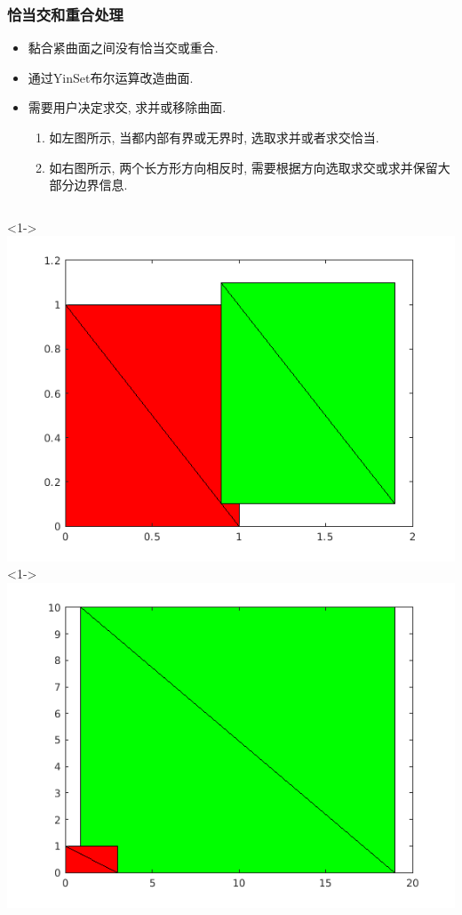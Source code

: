 \documentclass[UTF8]{ctexbeamer}	%
\theoremstyle{plain}
\theoremstyle{definition}
\theoremstyle{remark}
\numberwithin{equation}{section}
\begin{document}
\begin{frame}
    \frametitle{恰当交和重合处理}
    \begin{itemize}
        \item 黏合紧曲面之间没有恰当交或重合.

        \item 通过YinSet布尔运算改造曲面.
        
        \item 需要用户决定求交, 求并或移除曲面.
        \begin{enumerate}[1]
            \item 如左图所示, 当都内部有界或无界时,
            选取求并或者求交恰当.
            \item 如右图所示, 两个长方形方向相反时, 
            需要根据方向选取求交或求并保留大部分边界信息.
        \end{enumerate}
    \end{itemize}
    \begin{columns}
        <1->
        \centering
        \includegraphics[width = .8\textwidth]{fig/rectangle1.png}
        <1->
        \centering
        \includegraphics[width = .8\textwidth]{fig/rectangle2.png}
    \end{columns}
\end{frame}
\end{document}
